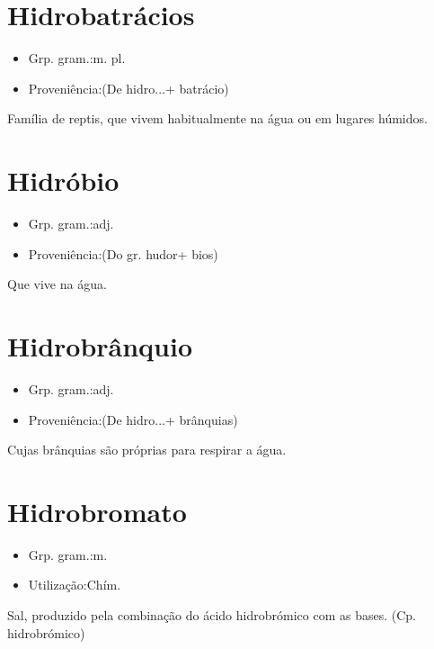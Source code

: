 \documentclass{article}
\begin{document}
\section{Hidrobatrácios}
\begin{itemize}
\item {Grp. gram.:m. pl.}
\end{itemize}
\begin{itemize}
\item {Proveniência:(De \textunderscore hidro...\textunderscore  + \textunderscore batrácio\textunderscore )}
\end{itemize}
Família de reptis, que vivem habitualmente na água ou em lugares húmidos.
\section{Hidróbio}
\begin{itemize}
\item {Grp. gram.:adj.}
\end{itemize}
\begin{itemize}
\item {Proveniência:(Do gr. \textunderscore hudor\textunderscore  + \textunderscore bios\textunderscore )}
\end{itemize}
Que vive na água.
\section{Hidrobrânquio}
\begin{itemize}
\item {Grp. gram.:adj.}
\end{itemize}
\begin{itemize}
\item {Proveniência:(De \textunderscore hidro...\textunderscore  + \textunderscore brânquias\textunderscore )}
\end{itemize}
Cujas brânquias são próprias para respirar a água.
\section{Hidrobromato}
\begin{itemize}
\item {Grp. gram.:m.}
\end{itemize}
\begin{itemize}
\item {Utilização:Chím.}
\end{itemize}
Sal, produzido pela combinação do ácido hidrobrómico com as bases.
(Cp. \textunderscore hidrobrómico\textunderscore )
\end{document}
